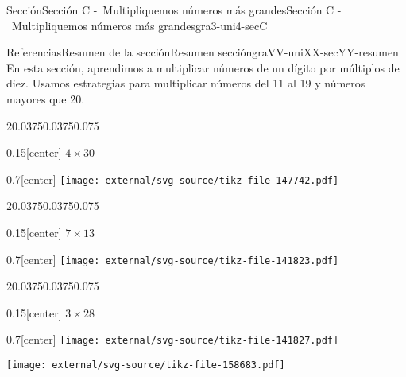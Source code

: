 \documentclass[twoside,14pt,]{extarticle}
\begin{document}
\begin{sectionptx}{Sección}{Sección C -~Multipliquemos números más grandes}{}{Sección C -~Multipliquemos números más grandes}{}{}{gra3-uni4-secC}
\begin{references-subsection}{Referencias}{Resumen de la sección}{}{Resumen sección}{}{}{graVV-uniXX-secYY-resumen}
En esta sección, aprendimos a multiplicar números de un dígito por múltiplos de diez. Usamos estrategias para multiplicar números del 11 al 19 y números mayores que 20.%
\begin{sidebyside}{2}{0.0375}{0.0375}{0.075}%
\begin{sbspanel}{0.15}[center]%
\(4\times 30\)%
\end{sbspanel}%
\begin{sbspanel}{0.7}[center]%
\texttt{[image: external/svg-source/tikz-file-147742.pdf]}
\end{sbspanel}%
\end{sidebyside}%
\begin{sidebyside}{2}{0.0375}{0.0375}{0.075}%
\begin{sbspanel}{0.15}[center]%
\(7\times 13\)%
\end{sbspanel}%
\begin{sbspanel}{0.7}[center]%
\texttt{[image: external/svg-source/tikz-file-141823.pdf]}
\end{sbspanel}%
\end{sidebyside}%
\begin{sidebyside}{2}{0.0375}{0.0375}{0.075}%
\begin{sbspanel}{0.15}[center]%
\(3\times 28\)%
\end{sbspanel}%
\begin{sbspanel}{0.7}[center]%
\texttt{[image: external/svg-source/tikz-file-141827.pdf]}
\par
\texttt{[image: external/svg-source/tikz-file-158683.pdf]}
\end{sbspanel}%
\end{sidebyside}%
\end{references-subsection}
\end{sectionptx}
%
%
\typeout{************************************************}
\typeout{************************************************}
%
\end{document}
